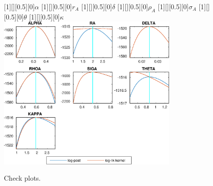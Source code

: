  
\begin{figure}[H]
[1][][0.5][0]{$ {\alpha} $}
[1][][0.5][0]{$ {r_{A}} $}
[1][][0.5][0]{$ {\delta} $}
[1][][0.5][0]{$ {\rho_A} $}
[1][][0.5][0]{$ {\sigma_A} $}
[1][][0.5][0]{$ {\theta} $}
[1][][0.5][0]{$ {\kappa} $}
\centering 
\includegraphics[width=0.80\textwidth]{KimModTheBuilder_CheckPlots1}
\caption{Check plots.}\label{Fig:CheckPlots:1}
\end{figure}
 
